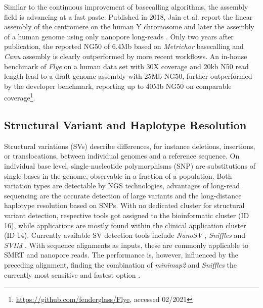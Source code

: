 Similar to the continuous improvement of basecalling algorithms, the assembly field is advancing at a fast paste.
Published in 2018, Jain et al. report the linear assembly of the centromere on the human Y chromosome and later the assembly of a human genome using only nanopore long-reads \cite{Jain2018, Jain2018b}.
Only two years after publication, the reported NG50 of 6.4Mb based on \textit{Metrichor} basecalling and \textit{Canu} assembly is clearly outperformed by more recent workflows.
An in-house benchmark of \textit{Flye} on a human data set with 30X coverage and 20kb N50 read length lead to a draft genome assembly with 25Mb NG50, further outperformed by the developer benchmark, reporting up to 40Mb NG50 on comparable coverage\footnote{\url{https://github.com/fenderglass/Flye}, accessed 02/2021}.




\subsection{Structural Variant and Haplotype Resolution}
\label{subsec:state_of_art:sv}

Structural variations (SVs) describe differences, for instance deletions, insertions, or translocations, between individual genomes and a reference sequence.
On individual base level, single-nucleotide polymorphisms (SNP) are substitutions of single bases in the genome, observable in a fraction of a population.
Both variation types are detectable by NGS technologies, advantages of long-read sequencing are the accurate detection of large variants and the long-distance haplotype resolution based on SNPs.
With no dedicated cluster for structural variant detection, respective tools got assigned to the bioinformatic cluster (ID 16), while applications are mostly found within the clinical application cluster (ID 14).
Currently available SV detection tools include \textit{NanoSV} \cite{Stancu2017}, \textit{Sniffles} \cite{Sedlazeck2018} and \textit{SVIM} \cite{Heller2019}.
With sequence alignments as inputs, these are commonly applicable to SMRT and nanopore reads.
The performance is, however, influenced by the preceding alignment, finding the combination of \textit{minimap2} and \textit{Sniffles} the currently most sensitive and fastest option \cite{Coster2019}.


